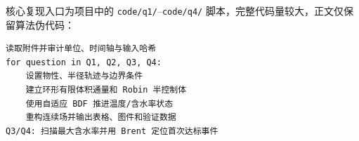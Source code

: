 \vspace{1.1em}
核心复现入口为项目中的 \texttt{code/q1/}--\texttt{code/q4/} 脚本，完整代码量较大，正文仅保留算法伪代码：
\begin{lstlisting}
读取附件并审计单位、时间轴与输入哈希
for question in Q1, Q2, Q3, Q4:
    设置物性、半径轨迹与边界条件
    建立环形有限体积通量和 Robin 半控制体
    使用自适应 BDF 推进温度/含水率状态
    重构连续场并输出表格、图件和验证数据
Q3/Q4: 扫描最大含水率并用 Brent 定位首次达标事件
\end{lstlisting}

